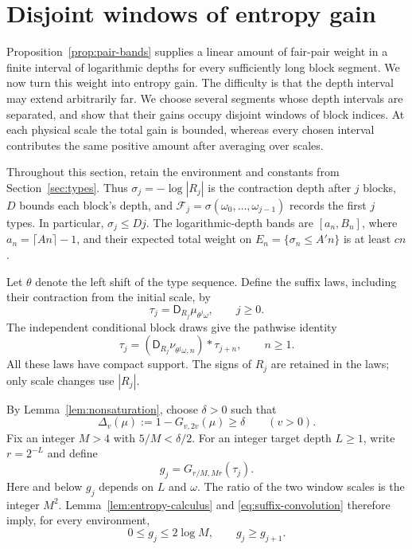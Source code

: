 \section{Disjoint windows of entropy gain}\label{sec:windows}

Proposition~\ref{prop:pair-bands} supplies a linear amount of fair-pair
weight in a finite interval of logarithmic depths for every sufficiently long block
segment.  We now turn this weight into entropy gain.  The difficulty is
that the depth interval may extend arbitrarily far.  We choose several
segments whose depth intervals are separated, and show that their gains
occupy disjoint windows of block indices.  At each physical scale the
total gain is bounded, whereas every chosen interval contributes the same
positive amount after averaging over scales.

Throughout this section, retain the environment and constants from
Section~\ref{sec:types}.  Thus $\sigma_j=-\log|R_j|$ is the contraction
depth after $j$ blocks, $D$ bounds each block's depth, and
$\mathcal F_j=\sigma(\omega_0,\ldots,\omega_{j-1})$ records the first
$j$ types.  In particular, $\sigma_j\le Dj$.  The logarithmic-depth bands are
$[a_n,B_n]$, where $a_n=\lceil An\rceil-1$, and their expected total
weight on $E_n=\{\sigma_n\le A'n\}$ is at least $cn$.

Let $\theta$ denote the left shift of the type sequence.  Define the
suffix laws, including their contraction from the initial scale, by
\[
 \tau_j=\mathsf D_{R_j}\mu_{\theta^j\omega},\qquad j\ge0.
\]
The independent conditional block draws give the pathwise identity
\begin{equation}\label{eq:suffix-convolution}
 \tau_j=(\mathsf D_{R_j}\nu_{\theta^j\omega,n})*\tau_{j+n},
 \qquad n\ge1.
\end{equation}
All these laws have compact support.  The signs of $R_j$ are retained in
the laws; only scale changes use $|R_j|$.

By Lemma~\ref{lem:nonsaturation}, choose $\delta>0$ such that
\[
 \Delta_v(\mu):=1-G_{v,2v}(\mu)\ge\delta\qquad(v>0).
\]
Fix an integer $M>4$ with $5/M<\delta/2$.  For an integer target depth
$L\ge1$, write $r=2^{-L}$ and define
\begin{equation}\label{eq:window-entropy}
 g_j=G_{r/M,Mr}(\tau_j).
\end{equation}
Here and below $g_j$ depends on $L$ and $\omega$.  The ratio of the two
window scales is the integer $M^2$.  Lemma~\ref{lem:entropy-calculus}
and \eqref{eq:suffix-convolution} therefore imply, for every environment,
\begin{equation}\label{eq:window-monotonicity}
 0\le g_j\le2\log M,\qquad g_j\ge g_{j+1}.
\end{equation}

